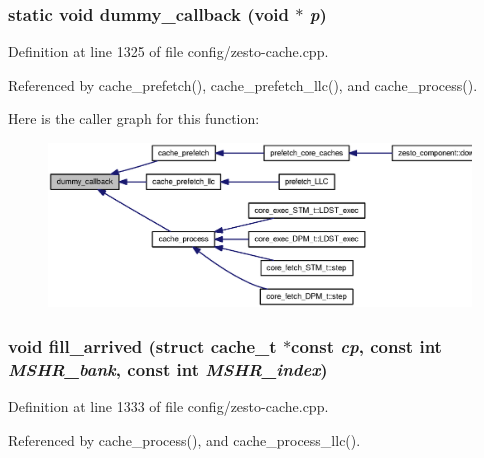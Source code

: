 \subsubsection[{dummy\_\-callback}]{\setlength{\rightskip}{0pt plus 5cm}static void dummy\_\-callback (void $\ast$ {\em p})\hspace{0.3cm}{\tt  [static]}}\label{config_2zesto-cache_8cpp_2ca1ae8eb0053c08276d5e170a5f98d8}




Definition at line 1325 of file config/zesto-cache.cpp.

Referenced by cache\_\-prefetch(), cache\_\-prefetch\_\-llc(), and cache\_\-process().

Here is the caller graph for this function:\nopagebreak
\begin{figure}[H]
\begin{center}
\leavevmode
\includegraphics[width=420pt]{config_2zesto-cache_8cpp_2ca1ae8eb0053c08276d5e170a5f98d8_icgraph}
\end{center}
\end{figure}
\subsubsection[{fill\_\-arrived}]{\setlength{\rightskip}{0pt plus 5cm}void fill\_\-arrived (struct {\bf cache\_\-t} $\ast$const  {\em cp}, \/  const int {\em MSHR\_\-bank}, \/  const int {\em MSHR\_\-index})}\label{config_2zesto-cache_8cpp_4d5f99649851ca3db130a4a6228a1f35}




Definition at line 1333 of file config/zesto-cache.cpp.

Referenced by cache\_\-process(), and cache\_\-process\_\-llc().

